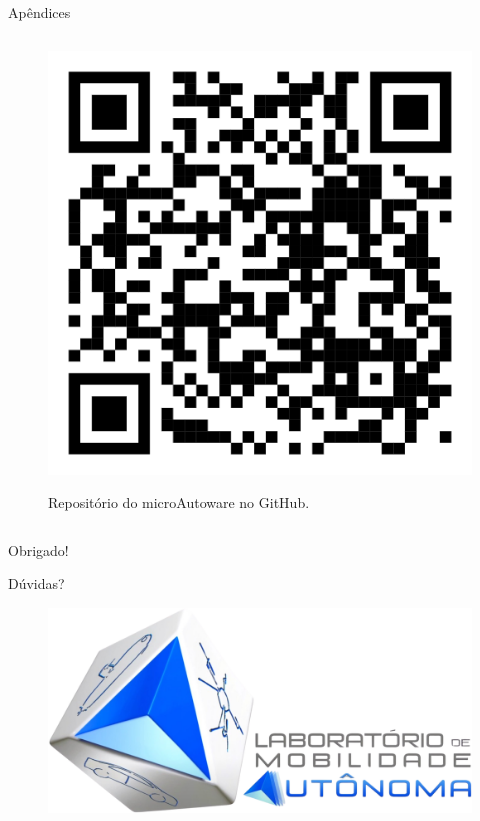 \documentclass{if-beamer}
\begin{document}
\begin{frame}{Apêndices}
\begin{columns}
		\begin{column}{0.5\textwidth}
			
			\begin{figure}[H]
				\centering
				\href{https://youtu.be/7OOIyOqvU_o}{\includegraphics[width=0.8\linewidth]{qr_code_youtube}}
				\caption{Repositório do microAutoware no GitHub.}
				\label{fig:qr_code_github}
			\end{figure}
			
			
			
		\end{column}
		
	\end{columns}
	
\end{frame}


\begin{frame}{}
	
	\begin{block}{}
		
		\centering
		\Huge{Obrigado!}
		
		\LARGE
		
		\vspace{5mm}
		
		Dúvidas?
		
	\end{block}
	
	\vspace{4mm}
	
	\begin{figure}[H]
		\centering
		\includegraphics[width=0.5\linewidth]{img/core/Logo_LMA.png}
	\end{figure}
	
\end{frame}
\end{document}
